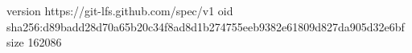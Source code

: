 version https://git-lfs.github.com/spec/v1
oid sha256:d89badd28d70a65b20c34f8ad8d1b274755eeb9382e61809d827da905d32e6bf
size 162086
